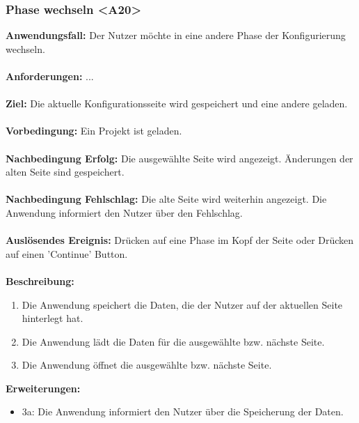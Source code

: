 \documentclass[parskip=full]{scrartcl} %
\begin{document}
\subsubsection*{Phase wechseln <A20>}
\textbf{Anwendungsfall:} Der Nutzer möchte in eine andere Phase der Konfigurierung wechseln.\\\\
\textbf{Anforderungen:} ...\\\\
\textbf{Ziel:} Die aktuelle Konfigurationsseite wird gespeichert und eine andere geladen. \\\\
\textbf{Vorbedingung:} Ein Projekt ist geladen. \\\\
\textbf{Nachbedingung Erfolg:} Die ausgewählte Seite wird angezeigt. Änderungen der alten Seite sind gespeichert.\\\\
\textbf{Nachbedingung Fehlschlag:} Die alte Seite wird weiterhin angezeigt. Die Anwendung informiert den Nutzer über den Fehlschlag. \\\\
\textbf{Auslösendes Ereignis:} Drücken auf eine Phase im Kopf der Seite oder Drücken auf einen 'Continue' Button. \\\\
\textbf{Beschreibung:}
\begin{enumerate}
    \item Die Anwendung speichert die Daten, die der Nutzer auf der aktuellen Seite hinterlegt hat.
    \item Die Anwendung lädt die Daten für die ausgewählte bzw. nächste Seite.
    \item Die Anwendung öffnet die ausgewählte bzw. nächste Seite.
\end{enumerate}
\textbf{Erweiterungen:} 
\begin{itemize}
    \item 3a: Die Anwendung informiert den Nutzer über die Speicherung der Daten.
\end{itemize}
\newpage
\end{document}
